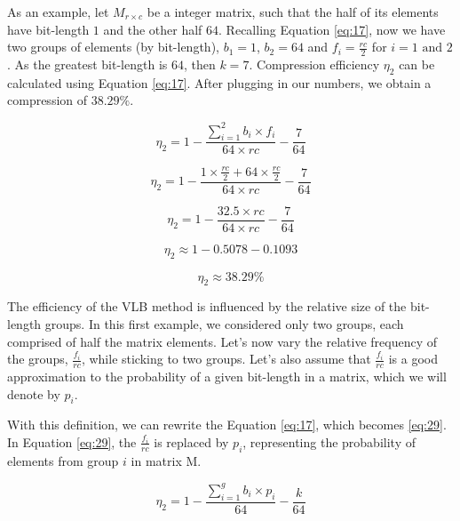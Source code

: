 \documentclass[10pt]{article}
\begin{document}
As an example, let $M_{r\times c}$ be a integer matrix, such that the half of 
its elements have bit-length $1$ and the other half $64$. Recalling Equation 
\ref{eq:17}, now we have two groups of elements (by bit-length), $b_1=1 $, 
$b_2=64$ and $f_i = \frac{rc}{2}$ for $i = 1 \text{ and } 2$. As the greatest 
bit-length is $64$, then $k=7$. Compression efficiency $\eta_2$ can be 
calculated using Equation \ref{eq:17}. After plugging in our numbers, we obtain 
a compression of $38.29\%$.

\begin{equation*}\label{eq:25}
 \eta_2 = 1 - \frac{\sum_{i=1}^{2}  b_i \times f_i }{64 \times rc} - \frac{7}{64} 
\end{equation*}

\begin{equation*}\label{eq:26}
 \eta_2 = 1 - \frac{  1 \times \frac{rc}{2} + 64 \times \frac{rc}{2} }{64 \times rc} - \frac{7}{64} 
\end{equation*}

\begin{equation*}\label{eq:26}
 \eta_2 = 1 - \frac{  32.5  \times rc }{64 \times rc} - \frac{7}{64} 
\end{equation*}

\begin{equation*}\label{eq:27}
 \eta_2 \approx 1 - 0.5078 - 0.1093
\end{equation*}

\begin{equation*}\label{eq:28}
 \eta_2 \approx 38.29\%
\end{equation*}

The efficiency of the VLB method is influenced by the relative size of the 
bit-length groups. In this first example, we considered only two groups, each 
comprised of half the matrix elements. Let's now vary the relative frequency of 
the groups, $\frac{f_i}{rc}$, while sticking to two groups. Let's 
also  assume that $\frac{f_i}{rc}$ is a good approximation to the 
probability of a given bit-length in a matrix, which we will denote by $p_i$.

With this definition, we can rewrite the Equation \ref{eq:17}, which becomes 
\ref{eq:29}. In Equation \ref{eq:29}, the $\frac{f_i}{rc}$ is replaced by $p_i$, 
representing the probability of elements from group $i$ in matrix M.

\begin{equation}\label{eq:29}
 \eta_2 = 1 - \frac{\sum_{i=1}^{g}  b_i \times p_i }{64} - \frac{k}{64} 
\end{equation}
\end{document}
